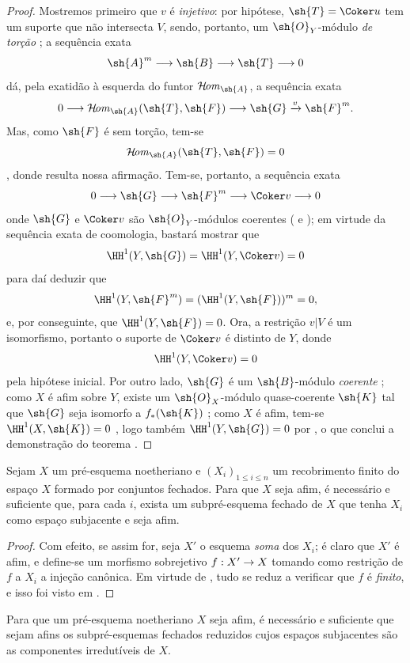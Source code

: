 \documentclass[oneside,10pt]{amsart}
\makeatletter
\renewcommand{\leq}{\leqslant}
\newcommand{\ega@arrow}[2]{\mathchoice{#1}{#2}{#2}{#2}}
\renewcommand{\to}{\ega@arrow{\longrightarrow}{\rightarrow}}
\def\shHom{\mathcal{H}\!\mathit{om}}
\newcommand{\oldpage}[2][]{\marginnote{\normalfont\footnotesize\textbf{#1}~|~#2}\ignorespaces}
\let\EGAOriginalLabel\label
\renewcommand{\label}[1]{\phantomsection\EGAOriginalLabel{#1}}
\makeatother
\begin{document}
\begin{proof}
Mostremos primeiro que $v$ é \emph{injetivo}:
por hipótese, $\sh{T}=\Coker u$ tem um suporte que não intersecta $V$, sendo, portanto, um $\sh{O}_Y$-módulo \emph{de torção} ;
a sequência exata
\[
  \sh{A}^m\to\sh{B}\to\sh{T}\to0
\]
dá, pela exatidão à esquerda do funtor $\shHom_{\sh{A}}$, a sequência exata
\[
  0\to\shHom_{\sh{A}}(\sh{T},\sh{F})
  \to\sh{G}\xrightarrow{v}\sh{F}^m.
\]
Mas, como $\sh{F}$ é sem torção, tem-se
\[
  \shHom_{\sh{A}}(\sh{T},\sh{F})=0
\]
, donde resulta nossa afirmação.
Tem-se, portanto, a sequência exata
\[
  0\to\sh{G}\to\sh{F}^m\to\Coker v\to0
\]
\oldpage[II]{138}
onde $\sh{G}$ e $\Coker v$ são $\sh{O}_Y$-módulos coerentes ( e );
em virtude da sequência exata de coomologia, bastará mostrar que
\[
  \HH^1(Y,\sh{G})=\HH^1(Y,\Coker v)=0
\]
para daí deduzir que
\[
  \HH^1(Y,\sh{F}^m)=(\HH^1(Y,\sh{F}))^m=0,
\]
e, por conseguinte, que $\HH^1(Y,\sh{F})=0$.
Ora, a restrição $v|V$ é um isomorfismo, portanto o suporte de $\Coker v$ é distinto de $Y$, donde
\[
  \HH^1(Y,\Coker v)=0
\]
pela hipótese inicial.
Por outro lado, $\sh{G}$ é um $\sh{B}$-módulo \emph{coerente} ;
como $X$ é afim sobre $Y$, existe um $\sh{O}_X$-módulo quase-coerente $\sh{K}$ tal que $\sh{G}$ seja isomorfo a $f_*(\sh{K})$ ;
como $X$ é afim, tem-se $\HH^1(X,\sh{K})=0$ , logo também $\HH^1(Y,\sh{G})=0$ por , o que conclui a demonstração do teorema .
\end{proof}

\begin{corollary}[6.7.2]
\label{II.6.7.2}
Sejam $X$ um pré-esquema noetheriano e $(X_i)_{1\leq i\leq n}$ um recobrimento finito do espaço $X$ formado por conjuntos fechados.
Para que $X$ seja afim, é necessário e suficiente que, para cada $i$, exista um subpré-esquema fechado de $X$ que tenha $X_i$ como espaço subjacente e seja afim.
\end{corollary}

\begin{proof}
Com efeito, se assim for, seja $X'$ o esquema \emph{soma} dos $X_i$;
é claro que $X'$ é afim, e define-se um morfismo sobrejetivo $f:X'\to X$ tomando como restrição de $f$ a $X_i$ a injeção canônica.
Em virtude de , tudo se reduz a verificar que $f$ é \emph{finito}, e isso foi visto em .
\end{proof}

\begin{corollary}[6.7.3]
\label{II.6.7.3}
Para que um pré-esquema noetheriano $X$ seja afim, é necessário e suficiente que sejam afins os subpré-esquemas fechados reduzidos cujos espaços subjacentes são as componentes irredutíveis de $X$.
\end{corollary}
\end{document}

